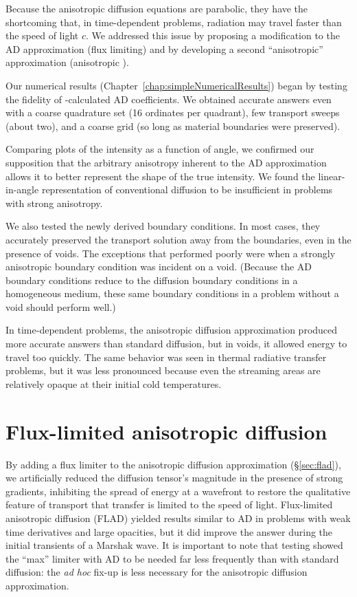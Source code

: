 Because the anisotropic diffusion equations are parabolic, they have the
shortcoming that, in time-dependent problems, radiation may travel faster than
the speed of light $c$. We addressed this issue by proposing a modification to
the AD approximation (flux limiting) and by developing a second ``anisotropic''
approximation (anisotropic \Pone).

Our numerical results (Chapter~\ref{chap:simpleNumericalResults}) began by
testing the fidelity of \SN-calculated AD coefficients. We obtained accurate
answers even with a coarse quadrature set (16 ordinates per quadrant), few
transport sweeps (about two), and a coarse grid (so long as material boundaries
were preserved).

Comparing plots of the intensity as a function of angle, we confirmed our
supposition that the arbitrary anisotropy inherent to the AD approximation
allows it to better represent the shape of the true intensity. We found
the linear-in-angle representation of conventional diffusion to be insufficient
in problems with strong anisotropy.

We also tested the newly derived boundary conditions. In most cases, they
accurately preserved the transport solution away from the boundaries, even in
the presence of voids. The exceptions that performed poorly were when a strongly
anisotropic boundary condition was incident on a void. (Because the AD boundary
conditions reduce to the diffusion boundary conditions in a homogeneous medium,
these same boundary conditions in a problem without a void should perform well.)

In time-dependent problems, the anisotropic diffusion approximation produced
more accurate answers than standard diffusion, but in voids, it allowed energy
to travel too quickly. The same behavior was seen in thermal radiative transfer
problems, but it was less pronounced because even the streaming areas are
relatively opaque at their initial cold temperatures.

\section{Flux-limited anisotropic diffusion}

By adding a flux limiter to the anisotropic diffusion approximation
(\S\ref{sec:flad}), we artificially reduced the diffusion tensor's magnitude in
the presence of strong gradients, inhibiting the spread of energy at a wavefront
to restore the qualitative feature of transport that transfer is limited to the
speed of light. Flux-limited anisotropic diffusion (FLAD) yielded results
similar to AD in problems with weak time derivatives and large opacities, but
it did improve the answer during the initial transients of a Marshak wave.
It is important to note that testing showed the ``max'' limiter with AD to be
needed far less frequently than with standard diffusion: the \emph{ad hoc}
fix-up is less necessary for the anisotropic diffusion approximation.

